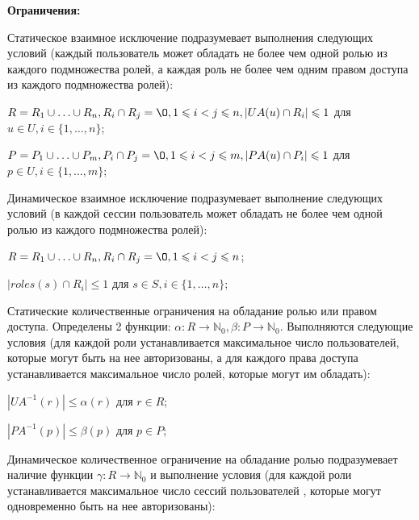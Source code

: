 \textbf{Ограничения:}
\begin{enumerate*}
	\item Статическое взаимное исключение подразумевает выполнения следующих условий (каждый пользователь может обладать не более чем одной ролью из каждого подмножества ролей, а каждая роль не более чем одним
	правом доступа из каждого подмножества ролей):
		\begin{itemize*}
			\item $R = R_1 \cup \ldots \cup R_n, R_i \cap R_j = \O, 1 \leqslant i < j \leqslant n, |UA(u) \cap R_i| \leqslant 1$ для $u \in U, i \in \{1, \ldots, n\}$;
			\item $P = P_1 \cup \ldots \cup P_m, P_i \cap P_j = \O, 1 \leqslant i < j \leqslant m, |PA(u) \cap P_i| \leqslant 1$ для $p \in U, i \in \{1, \ldots, m\}$;
		\end{itemize*}
	\item Динамическое взаимное исключение подразумевает выполнение следующих условий (в каждой сессии пользователь может обладать не более чем одной ролью из каждого подмножества ролей):
		\begin{itemize*}
			\item $R = R_1 \cup \ldots \cup R_n, R_i \cap R_j = \O, 1 \leqslant i < j \leqslant n$;
			\item $|roles(s) \cap R_i| \leqslant 1$ для $s \in S, i \in \{1, \ldots, n\}$;
		\end{itemize*}
	\item Статические количественные ограничения на обладание ролью или правом доступа. Определены 2 функции: $\alpha: R \to \mathbb{N}_0, \beta: P \to \mathbb{N}_0$.
	Выполняются следующие условия (для каждой роли устанавливается максимальное число пользователей, которые могут быть на нее авторизованы, а для каждого права доступа устанавливается максимальное число ролей, которые
	могут им обладать):
		\begin{itemize*}
			\item $|UA^{-1}(r)| \leqslant \alpha(r)$ для $r \in R$;
			\item $|PA^{-1}(p)| \leqslant \beta(p)$ для $p \in P$;
		\end{itemize*}
	\item Динамическое количественное ограничение на обладание ролью подразумевает наличие функции $\gamma: R \to \mathbb{N}_0$ и выполнение условия (для каждой роли устанавливается максимальное число сессий пользователей
	, которые могут одновременно быть на нее авторизованы):
		\begin{itemize*}

\end{itemize*}
\end{enumerate*}
